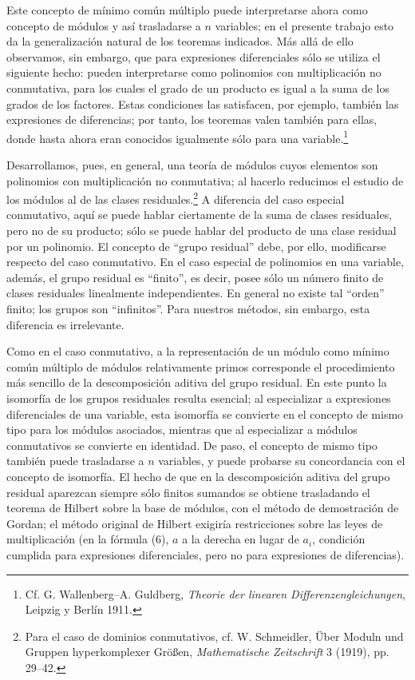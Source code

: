 \documentclass[11pt]{article}
\begin{document}
Este concepto de mínimo común múltiplo puede interpretarse ahora como concepto de módulos y así trasladarse a $n$ variables; en el presente trabajo esto da la generalización natural de los teoremas indicados. Más allá de ello observamos, sin embargo, que para expresiones diferenciales sólo se utiliza el siguiente hecho: pueden interpretarse como polinomios con multiplicación no conmutativa, para los cuales el grado de un producto es igual a la suma de los grados de los factores. Estas condiciones las satisfacen, por ejemplo, también las expresiones de diferencias; por tanto, los teoremas valen también para ellas, donde hasta ahora eran conocidos igualmente sólo para una variable.\footnote{Cf. G. Wallenberg--A. Guldberg, \emph{Theorie der linearen Differenzengleichungen}, Leipzig y Berlín 1911.}

Desarrollamos, pues, en general, una teoría de módulos cuyos elementos son polinomios con multiplicación no conmutativa; al hacerlo reducimos el estudio de los módulos al de las clases residuales.\footnote{Para el caso de dominios conmutativos, cf. W. Schmeidler, Über Moduln und Gruppen hyperkomplexer Größen, \emph{Mathematische Zeitschrift} 3 (1919), pp. 29--42.} A diferencia del caso especial conmutativo, aquí se puede hablar ciertamente de la suma de clases residuales, pero no de su producto; sólo se puede hablar del producto de una clase residual por un polinomio. El concepto de ``grupo residual'' debe, por ello, modificarse respecto del caso conmutativo. En el caso especial de polinomios en una variable, además, el grupo residual es ``finito'', es decir, posee sólo un número finito de clases residuales linealmente independientes. En general no existe tal ``orden'' finito; los grupos son ``infinitos''. Para nuestros métodos, sin embargo, esta diferencia es irrelevante.

Como en el caso conmutativo, a la representación de un módulo como mínimo común múltiplo de módulos relativamente primos corresponde el procedimiento más sencillo de la descomposición aditiva del grupo residual. En este punto la isomorfía de los grupos residuales resulta esencial; al especializar a expresiones diferenciales de una variable, esta isomorfía se convierte en el concepto de mismo tipo para los módulos asociados, mientras que al especializar a módulos conmutativos se convierte en identidad. De paso, el concepto de mismo tipo también puede trasladarse a $n$ variables, y puede probarse su concordancia con el concepto de isomorfía. El hecho de que en la descomposición aditiva del grupo residual aparezcan siempre sólo finitos sumandos se obtiene trasladando el teorema de Hilbert sobre la base de módulos, con el método de demostración de Gordan; el método original de Hilbert exigiría restricciones sobre las leyes de multiplicación (en la fórmula (6), $a$ a la derecha en lugar de $a_i$, condición cumplida para expresiones diferenciales, pero no para expresiones de diferencias).
\end{document}
